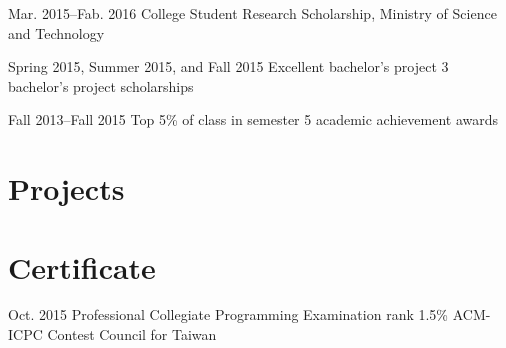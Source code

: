 \documentclass[12pt,a4paper,sans,english]{moderncv}
\begin{document}
    \cventry
        {Mar. 2015--Fab. 2016}
        {}
        {College Student Research Scholarship, Ministry of Science and Technology}
        {}
        {}
        {}
        
    \cventry
        {Spring 2015, Summer 2015, and Fall 2015}
        {Excellent bachelor's project}
        {3 bachelor's project scholarships}
        {}
        {}
        {}
        
    \cventry
        {Fall 2013--Fall 2015}
        {Top 5\% of class in semester}
        {5 academic achievement awards}
        {}
        {}
        {}
        
\section{Projects}

        
\section{Certificate}
    \cventry
        {Oct. 2015} %
        {Professional} %
        {Collegiate Programming Examination} %
        {}
        {rank 1.5\%} %
        {ACM-ICPC Contest Council for Taiwan} %

\end{document}
